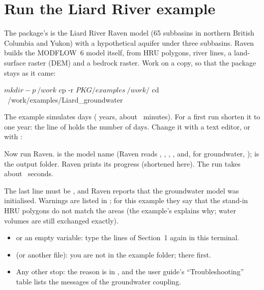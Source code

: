 \section{Run the Liard River example}
The package's  is the Liard River Raven model (65 subbasins in northern British Columbia
and Yukon) with a hypothetical aquifer under three subbasins. Raven builds the MODFLOW~6 model itself, from HRU polygons,
river lines, a land-surface raster (DEM) and a bedrock raster. Work on a copy, so that the package stays as it came:
\begin{shell}
$ mkdir -p ~/work
$ cp -r $PKG/examples ~/work/
$ cd ~/work/examples/Liard_groundwater
\end{shell}
The example simulates  days ( years, about ~minutes). For a first run shorten it to one year: the
 line of  holds the number of days. Change it with a text editor, or with :
Now run Raven.  is the model name (Raven reads , , , ,
 and, for groundwater, );  is the output folder.
Raven prints its progress (shortened here). The run takes about ~seconds.
\begin{tocheck}
The last line must be , and Raven reports that the groundwater model was
initialised. Warnings are listed in ; for this example they say that the stand-in HRU polygons
do not match the  areas (the example's  explains why; water volumes are still exchanged exactly).
\end{tocheck}
\begin{trouble}
\begin{itemize}
\item {} or an empty variable: type the  lines of Section~1 again in this terminal.
\item {} (or another file): you are not in the example folder;  there first.
\item Any other stop: the reason is in , and the user guide's ``Troubleshooting'' table lists the
      messages of the groundwater coupling.
\end{itemize}
\end{trouble}

